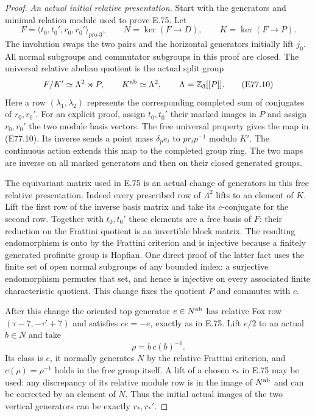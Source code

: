 \begin{proof}
\emph{An actual initial relative presentation.}
Start with the generators and minimal relation
module used to prove E.75. Let
\[
 F=\langle t_0,t_0',r_0,r_0'\rangle_{\mathrm{pro}\text{-}3},
 \qquad N=\ker(F\to D),\qquad
 K=\ker(F\to P).
 \tag{E77.9}
\]
The involution swaps the two pairs and the
horizontal generators initially lift $j_0$.
All normal subgroups and commutator subgroups
in this proof are closed. The universal relative
abelian quotient is the actual split group
\[
 F/K'\simeq \Lambda^2\rtimes P,\qquad
 K^{\rm ab}\simeq\Lambda^2,\qquad
 \Lambda=\mathbb Z_3[[P]].
 \tag{E77.10}
\]
Here a row $(\lambda_1,\lambda_2)$ represents
the corresponding completed sum of conjugates
of $r_0,r_0'$. For an explicit proof, assign
$t_0,t_0'$ their marked images in $P$ and assign
$r_0,r_0'$ the two module basis vectors.
The free universal property gives the map in
(E77.10). Its inverse sends a point mass
$\delta_p e_i$ to $p r_i p^{-1}$ modulo $K'$.
The continuous action extends this map to the
completed group ring. The two maps are inverse
on all marked generators and then on their
closed generated groups.

The equivariant matrix used in E.75 is an
actual change of generators in this free
relative presentation. Indeed every prescribed
row of $\Lambda^2$ lifts to an element of $K$.
Lift the first row of the inverse basis matrix
and take its $c$-conjugate for the second row.
Together with $t_0,t_0'$ these elements are a
free basis of $F$: their reduction on the
Frattini quotient is an invertible block
matrix. The resulting endomorphism is onto
by the Frattini criterion and is injective
because a finitely generated profinite group
is Hopfian. One direct proof of the latter
fact uses the finite set of open normal
subgroups of any bounded index: a surjective
endomorphism permutes that set, and hence
is injective on every associated finite
characteristic quotient.
This change fixes the quotient $P$ and
commutes with $c$.

After this change the oriented top generator
$e\in N^{\rm ab}$ has relative Fox row
$(\tau-7,-\tau'+7)$ and satisfies $ce=-e$,
exactly as in E.75. Lift $e/2$ to an actual
$b\in N$ and take
\[
 \rho=b\,c(b)^{-1}.
 \tag{E77.11}
\]
Its class is $e$, it normally generates $N$
by the relative Frattini criterion, and
$c(\rho)=\rho^{-1}$ holds in the free group
itself. A lift of a chosen $r_*$ in E.75 may
be used: any discrepancy of its relative
module row is in the image of $N^{\rm ab}$
and can be corrected by an element of $N$.
Thus the initial actual images of the two
vertical generators can be exactly $r_*,r_*'$.


\end{proof}
